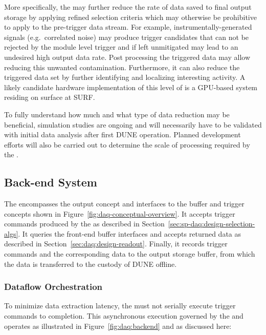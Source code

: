 More specifically, the  may further reduce the rate of data saved to final output storage by
applying refined selection criteria which may otherwise be prohibitive
to apply to the pre-trigger data stream.  For example, instrumentally-generated signals (e.g.~correlated noise)
may produce trigger candidates that can not be rejected by the module
level trigger and if left unmitigated may lead to an undesired high
output data rate. 
Post processing the triggered data may allow reducing this unwanted
contamination.
Furthermore, it can also reduce the triggered data set by further identifying
and localizing interesting activity. A likely candidate hardware
implementation of this level of  is a GPU-based system
residing on surface at SURF.

To fully understand how much and what type of data reduction may be
beneficial, simulation studies are ongoing  and will
necessarily have to be
validated with initial data analysis after
first DUNE  operation. Planned 
development efforts will also be carried out to determine the scale of
processing required by the .

\subsection{Back-end System}
\label{sec:fd-daq:design-backend}

The  encompasses the output concept and interfaces to the buffer and trigger concepts shown in Figure~\ref{fig:daq-conceptual-overview}. 
It accepts trigger commands produced by the  as described in Section~\ref{sec:sp-daq:design-selection-algs}. 
It queries the front-end buffer interfaces and accepts returned data as described in Section~\ref{sec:daq:design-readout}. 
Finally, it records trigger commands and the corresponding data to the output storage buffer, from which the data is transferred to the custody of DUNE offline.

\subsubsection{Dataflow Orchestration}

To minimize data extraction latency, the  must not serially execute trigger commands to completion. 
This asynchronous execution governed by the  and operates as illustrated in Figure~\ref{fig:daq:backend} and as discussed here:

